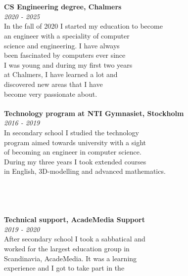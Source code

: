 \documentclass[11pt,oneside,a4paper,titlepage]{article}
\begin{document}
\begin{tcolorbox}
\begin{minipage}[t]{12cm}
\begin{tcolorbox}[grow to left by=-10pt,colframe=white,colback=white,sharp corners]
            {\selectfont
                \\
                \\\textbf{CS Engineering degree, Chalmers} \\
                \emph{2020 - 2025} \\
                In the fall of 2020 I started my education to become\\
                an engineer with a speciality of computer\\
                science and engineering. I have always\\
                been fascinated by computers ever since\\
                I was young and during my first two years\\
                at Chalmers, I have learned a lot and\\
                discovered new areas that I have\\
                become very passionate about.\\\\
                \textbf{Technology program at NTI Gymnasiet, Stockholm} \\
                \emph{2016 - 2019} \\
                In secondary school I studied the technology\\
                program aimed towards university with a sight\\
                of becoming an engineer in computer science.\\
                During my three years I took extended courses\\
                in English, 3D-modelling and advanced mathematics.\\\\\\
                \\
                \\\textbf{Technical support, AcadeMedia Support}\\
                \emph{2019 - 2020}\\
                After secondary school I took a sabbatical and\\
                worked for the largest education group in\\
                Scandinavia, AcadeMedia. It was a learning\\
                experience and I got to take part in the\\
}
\end{tcolorbox}
\end{minipage}
\end{tcolorbox}
\end{document}
